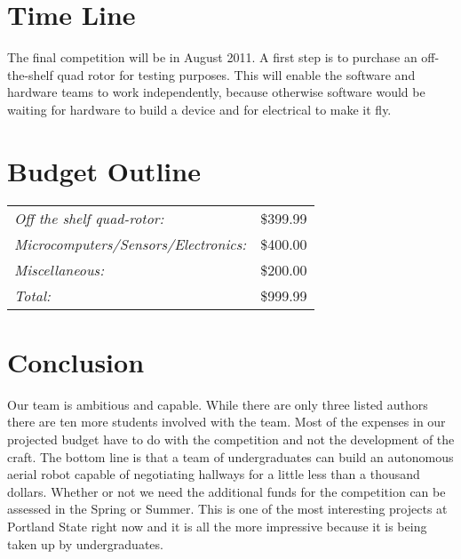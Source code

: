 \documentclass{article}
\begin{document}
\section{Time Line}

The final competition will be in August 2011. A first step is to purchase an off-the-shelf quad rotor for testing purposes. This will enable the software and hardware teams to work independently, because otherwise software would be waiting for hardware to build a device and for electrical to make it fly. 
\section{Budget Outline}

\begin{tabular}[t]{lr}
\it Off the shelf quad-rotor:           &\$399.99\\
\it Microcomputers/Sensors/Electronics: &\$400.00\\
\it Miscellaneous:                       &\$200.00\\\hline
\it Total:                              &\$999.99\\
\end{tabular}

\section{Conclusion}

Our team is ambitious and capable. While there are only three listed authors there are ten more students involved with the team. Most of the expenses in our projected budget have to do with the competition and not the development of the craft. The bottom line is that a team of undergraduates can build an autonomous aerial robot capable of negotiating hallways for a little less than a thousand dollars. Whether or not we need the additional funds for the competition can be assessed in the Spring or Summer. This is one of the most interesting projects at Portland State right now and it is all the more impressive because it is being taken up by undergraduates. 
\end{document}
